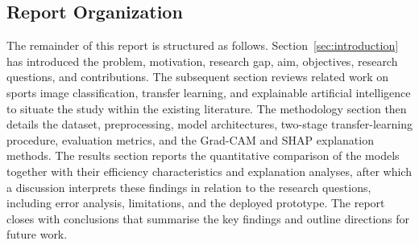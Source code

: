 \subsection{Report Organization}
\label{sec:intro-organization}

The remainder of this report is structured as follows.
Section~\ref{sec:introduction} has introduced the problem, motivation, research gap, aim, objectives, research questions, and contributions.
The subsequent section reviews related work on sports image classification, transfer learning, and explainable artificial intelligence to situate the study within the existing literature.
The methodology section then details the dataset, preprocessing, model architectures, two-stage transfer-learning procedure, evaluation metrics, and the Grad-CAM and SHAP explanation methods.
The results section reports the quantitative comparison of the models together with their efficiency characteristics and explanation analyses, after which a discussion interprets these findings in relation to the research questions, including error analysis, limitations, and the deployed prototype.
The report closes with conclusions that summarise the key findings and outline directions for future work.
